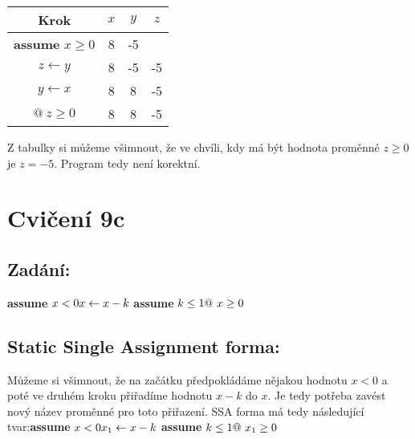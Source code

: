 \documentclass{article}
\begin{document}
\begin{table}[H]\centering

\begin{tabular}{|c|c|c|c|}
    
        \hline \textbf{Krok} & $x$ & $y$ & $z$ \\ \hline \hline
    	\textbf{assume} $x \geq 0$ & 8 & -5  & \\  \hline
    	$z \leftarrow y$ & 8 & -5 & -5 \\ \hline
    	$y \leftarrow x$ & 8 & 8 & -5 \\ \hline
    	$@ \ z \geq 0$ & 8 & 8 & -5 \\ \hline
    	
    	
    	\end{tabular}
\end{table}

Z tabulky si můžeme všimnout, že ve chvíli, kdy má být hodnota proměnné $z \geq 0$ je $z = -5$. Program tedy není korektní.

\section{Cvičení 9c}

\subsection{Zadání:}

\textbf{assume} $x < 0 \newline x \leftarrow x - k \newline$ \textbf{assume}  $ k \leq 1 \newline @ \ x \geq 0$
    

\subsection{Static Single Assignment forma:}

Můžeme si všimnout, že na začátku předpokládáme nějakou hodnotu $x < 0$ a poté ve druhém kroku přiřadíme hodnotu $x - k$ do $x$. Je tedy potřeba  zavést nový název proměnné pro toto přiřazení. SSA forma má tedy následující tvar:\newline\newline \textbf{assume} $x < 0 \newline x_1 \leftarrow x - k \newline$ \textbf{assume}  $ k \leq 1 \newline @ \ x_1 \geq 0$
\end{document}
